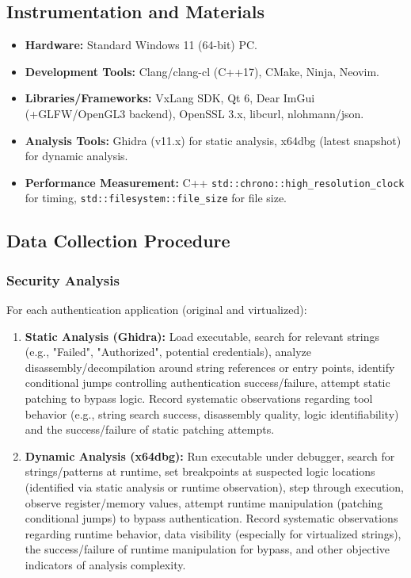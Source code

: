 \subsection{Instrumentation and Materials}
\begin{itemize}
    \item \textbf{Hardware:} Standard Windows 11 (64-bit) PC.
    \item \textbf{Development Tools:} Clang/clang-cl (C++17), CMake, Ninja, Neovim.
    \item \textbf{Libraries/Frameworks:} VxLang SDK, Qt 6, Dear ImGui (+GLFW/OpenGL3 backend), OpenSSL 3.x, libcurl, nlohmann/json.
    \item \textbf{Analysis Tools:} Ghidra (v11.x) for static analysis, x64dbg (latest snapshot) for dynamic analysis.
    \item \textbf{Performance Measurement:} C++ \texttt{std::chrono::high\_resolution\_clock} for timing, \texttt{std::filesystem::file\_size} for file size.
\end{itemize}


\subsection{Data Collection Procedure}

\subsubsection{Security Analysis}
For each authentication application (original and virtualized):
    \begin{enumerate}
        \item \textbf{Static Analysis (Ghidra):} Load executable, search for relevant strings (e.g., "Failed", "Authorized", potential credentials), analyze disassembly/decompilation around string references or entry points, identify conditional jumps controlling authentication success/failure, attempt static patching to bypass logic. Record systematic observations regarding tool behavior (e.g., string search success, disassembly quality, logic identifiability) and the success/failure of static patching attempts.
        \item \textbf{Dynamic Analysis (x64dbg):} Run executable under debugger, search for strings/patterns at runtime, set breakpoints at suspected logic locations (identified via static analysis or runtime observation), step through execution, observe register/memory values, attempt runtime manipulation (patching conditional jumps) to bypass authentication. Record systematic observations regarding runtime behavior, data visibility (especially for virtualized strings), the success/failure of runtime manipulation for bypass, and other objective indicators of analysis complexity.
    \end{enumerate}

